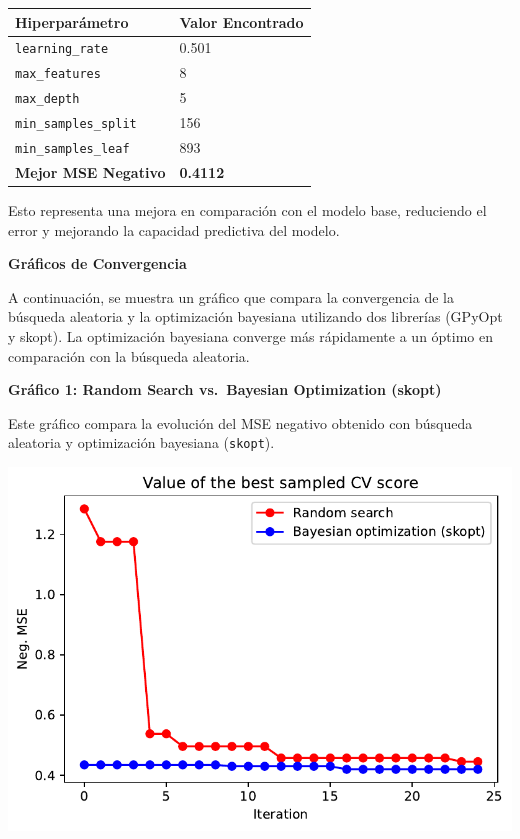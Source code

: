 \documentclass[
  12pt,
  letterpaper,
  DIV=11,
  numbers=noendperiod]{scrartcl}
\begin{document}
\begin{longtable}[]{@{}ll@{}}
\toprule\noalign{}
\textbf{Hiperparámetro} & \textbf{Valor Encontrado} \\
\midrule\noalign{}
\endhead
\bottomrule\noalign{}
\endlastfoot
\texttt{learning\_rate} & 0.501 \\
\texttt{max\_features} & 8 \\
\texttt{max\_depth} & 5 \\
\texttt{min\_samples\_split} & 156 \\
\texttt{min\_samples\_leaf} & 893 \\
\textbf{Mejor MSE Negativo} & \textbf{0.4112} \\
\end{longtable}

Esto representa una mejora en comparación con el modelo base, reduciendo
el error y mejorando la capacidad predictiva del modelo.

\newpage

\textbf{Gráficos de Convergencia}

A continuación, se muestra un gráfico que compara la convergencia de la
búsqueda aleatoria y la optimización bayesiana utilizando dos librerías
(GPyOpt y skopt). La optimización bayesiana converge más rápidamente a
un óptimo en comparación con la búsqueda aleatoria.

\textbf{Gráfico 1: Random Search vs.~Bayesian Optimization (skopt)}

Este gráfico compara la evolución del MSE negativo obtenido con búsqueda
aleatoria y optimización bayesiana (\texttt{skopt}).

\includegraphics{ProyFinal_OptBayesiana_2024_y_files/figure-pdf/cell-24-output-1.pdf}
\end{document}
